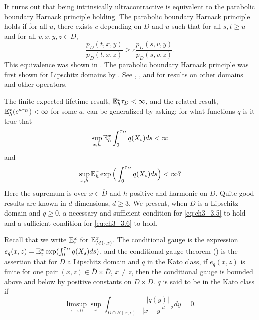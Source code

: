 It turns out that being intrinsically ultracontractive is equivalent to the parabolic boundary Harnack principle holding. The parabolic boundary Harnack principle holds if for all $u$, there exists $c$ depending on $D$ and $u$ such that for all $s,t \geq u$ and for all $v,x,y,z \in D$,
\mpagebreak
\[
    \frac{p_D(t,x,y)}{p_D(t,x,z)} \geq c\frac{p_D(s,v,y)}{p_D(s,v,z)}.
\]
This equivalence was shown in \cite{Davis1991}. The parabolic boundary Harnack principle was first shown for Lipschitz domains by \cite{CaffarelliFabesMortolaSalsa1981}. See \cite{Banuelos1991}, \cite{Davis1991}, and \cite{BassBurdzy1992} for results on other domains and other operators.



The finite expected lifetime result, $\mathbb{E}_h^x \tau_D<\infty$, and the related result, $\mathbb{E}_h^x(e^{a\tau_D}) < \infty$ for some $a$, can be generalized by asking: for what functions $q$ is it true that
\begin{equation}\label{eq:ch3_3.5}
    \sup_{x,h} \mathbb{E}_h^x \int_0^{\tau_D} q(X_s)ds < \infty
\end{equation}
and
\begin{equation}\label{eq:ch3_3.6}
    \sup_{x,h} \mathbb{E}_h^x \exp\Big(\int_0^{\tau_D} q(X_s)ds\Big) < \infty?
\end{equation}
Here the supremum is over $x \in \overline{D}$ and $h$ positive and harmonic on $D$. Quite good results are known in $d$ dimensions, $d \geq 3$. We present, when $D$ is a Lipschitz domain and $q \geq 0$, a necessary and sufficient condition for \eqref{eq:ch3_3.5} to hold and a sufficient condition for \eqref{eq:ch3_3.6} to hold.

Recall that we write $\mathbb{E}_z^x$ for $\mathbb{E}_{M(\cdot,z)}^x$. The conditional gauge is the expression $e_q(x,z) = \mathbb{E}_z^x\exp(\int_0^{\tau_D} q(X_s)ds)$, and the conditional gauge theorem (\cite[see][]{CranstonFabesZhao1988}) is the assertion that for $D$ a Lipschitz domain and $q$ in the Kato class, if $e_q(x,z)$ is finite for one pair $(x,z) \in \overline{D} \times \overline{D}$, $x \neq z$, then the conditional gauge is bounded above and below by positive constants on $\overline{D} \times \overline{D}$. $q$ is said to be in the Kato class if
\begin{equation}\label{eq:ch3_3.7}
    \limsup_{\epsilon \to 0} \sup_{x} \int_{D\cap B(x,\epsilon)} \frac{|q(y)|}{|x-y|^{d-2}}dy = 0.
\end{equation}

